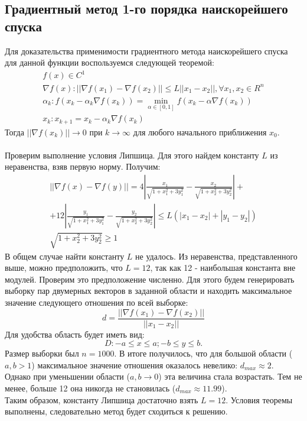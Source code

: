 \subsection{Градиентный метод 1-го порядка наискорейшего спуска}
Для доказательства применимости градиентного метода наискорейшего спуска для данной функции воспользуемся следующей теоремой:
\begin{gather}
f(x)\in C^1 \\
\nabla f(x): ||\nabla f(x_1) - \nabla f(x_2)||\leq L ||x_1-x_2||, \forall x_1, x_2 \in R^n \\
\alpha_k: f(x_k-\alpha_k\nabla f(x_k))=\min_{\alpha \in [0,1]} f(x_k-\alpha \nabla f(x_k)) \\
x_k: x_{k+1}=x_k-\alpha_k \nabla f(x_k)
\end{gather}
Тогда $||\nabla f(x_k)||\rightarrow 0$ при $k \rightarrow \infty$ для любого начального приближения $x_0$.\\
\\
Проверим выполнение условия Липшица. Для этого найдем константу $L$ из неравенства, взяв первую норму. Получим:
\begin{gather}
\nonumber||\nabla f(x) - \nabla f(y)||=4|\frac{x_1}{\sqrt{1+x_1^2+3y_1^2}}-\frac{x_2}{\sqrt{1+x_2^2+3y_2^2}}|+\\
\nonumber+12|\frac{y_1}{\sqrt{1+x_1^2+3y_1^2}}-\frac{y_2}{\sqrt{1+x_2^2+3y_2^2}}|\leq L(|x_1-x_2|+|y_1-y_2|)\\
\nonumber\sqrt{1+x_2^2+3y_2^2}\geq 1
\end{gather}
В общем случае найти константу $L$ не удалось. Из неравенства, представленного выше, можно предположить, что $L=12$, так как 12 - наибольшая константа вне модулей. Проверим это предположение численно. Для этого будем генерировать выборку пар двумерных векторов в заданной области и находить максимальное значение следующего отношения по всей выборке:
\begin{equation}
d=\frac{||\nabla f(x_1) - \nabla f(x_2)||}{||x_1-x_2||}
\end{equation}
Для удобства область будет иметь вид:
\begin{equation}
D: -a\leq x \leq a; -b \leq y \leq b.
\end{equation}
Размер выборки был $n=1000$.
В итоге получилось, что для большой области ($a,b>1$) максимальное значение отношения оказалось невелико: $d_{max}\approx 2$. Однако при уменьшении области ($a,b\rightarrow 0$) эта величина стала возрастать. Тем не менее, больше 12 она никогда не становилась ($d_{max}\approx 11.99$).\\
Таким образом, константу Липшица  достаточно взять $L=12$. Условия теоремы выполнены, следовательно метод будет сходиться к решению.

